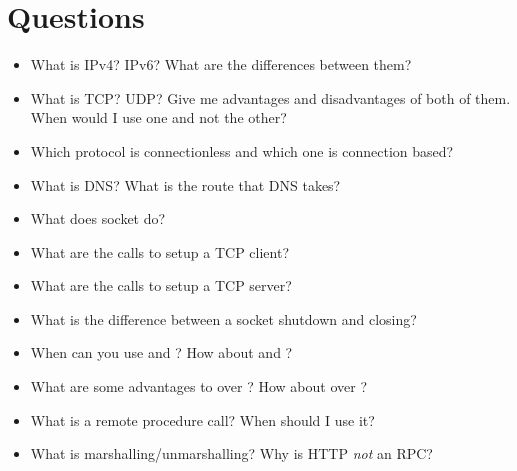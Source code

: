 \section{Questions}

\begin{itemize}
\item
  What is IPv4? IPv6? What are the differences between them?
\item
  What is TCP? UDP? Give me advantages and disadvantages of both of them.
  When would I use one and not the other?
\item
  Which protocol is connectionless and which one is connection based?
\item
  What is DNS? What is the route that DNS takes?
\item
  What does socket do?
\item
  What are the calls to setup a TCP client?
\item
  What are the calls to setup a TCP server?
\item
  What is the difference between a socket shutdown and closing?
\item
  When can you use  and ? How about  and ?
\item
  What are some advantages to  over ? How about  over ?
\item
  What is a remote procedure call? When should I use it?
\item
  What is marshalling/unmarshalling? Why is HTTP \emph{not} an RPC?
\end{itemize}



